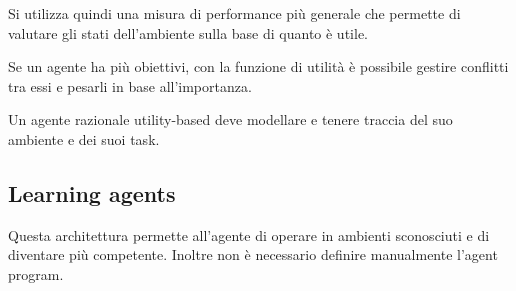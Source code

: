 Si utilizza quindi una misura di performance più generale che permette di valutare gli stati dell'ambiente
sulla base di quanto è utile.

Se un agente ha più obiettivi, con la funzione di utilità è possibile gestire conflitti tra essi e pesarli in base 
all'importanza.

Un agente razionale utility-based deve modellare e tenere traccia del suo ambiente e dei suoi task.

\subsection{Learning agents}
Questa architettura permette all'agente di operare in ambienti sconosciuti e di diventare più competente.
Inoltre non è necessario definire manualmente l'agent program.
